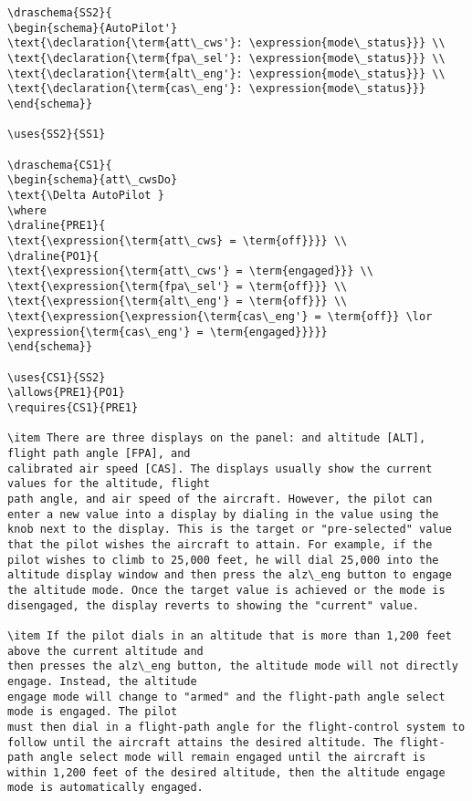 \begin{verbatim}
\draschema{SS2}{
\begin{schema}{AutoPilot'}
\text{\declaration{\term{att\_cws'}: \expression{mode\_status}}} \\
\text{\declaration{\term{fpa\_sel'}: \expression{mode\_status}}} \\
\text{\declaration{\term{alt\_eng'}: \expression{mode\_status}}} \\
\text{\declaration{\term{cas\_eng'}: \expression{mode\_status}}} 
\end{schema}}

\uses{SS2}{SS1}

\draschema{CS1}{
\begin{schema}{att\_cwsDo}
\text{\Delta AutoPilot }
\where
\draline{PRE1}{
\text{\expression{\term{att\_cws} = \term{off}}}} \\
\draline{PO1}{
\text{\expression{\term{att\_cws'} = \term{engaged}}} \\
\text{\expression{\term{fpa\_sel'} = \term{off}}} \\
\text{\expression{\term{alt\_eng'} = \term{off}}} \\
\text{\expression{\expression{\term{cas\_eng'} = \term{off}} \lor \expression{\term{cas\_eng'} = \term{engaged}}}}}
\end{schema}}

\uses{CS1}{SS2}
\allows{PRE1}{PO1}
\requires{CS1}{PRE1}

\item There are three displays on the panel: and altitude [ALT], flight path angle [FPA], and
calibrated air speed [CAS]. The displays usually show the current values for the altitude, flight
path angle, and air speed of the aircraft. However, the pilot can enter a new value into a display by dialing in the value using the knob next to the display. This is the target or "pre-selected" value that the pilot wishes the aircraft to attain. For example, if the pilot wishes to climb to 25,000 feet, he will dial 25,000 into the altitude display window and then press the alz\_eng button to engage the altitude mode. Once the target value is achieved or the mode is disengaged, the display reverts to showing the "current" value.

\item If the pilot dials in an altitude that is more than 1,200 feet above the current altitude and
then presses the alz\_eng button, the altitude mode will not directly engage. Instead, the altitude
engage mode will change to "armed" and the flight-path angle select mode is engaged. The pilot
must then dial in a flight-path angle for the flight-control system to follow until the aircraft attains the desired altitude. The flight-path angle select mode will remain engaged until the aircraft is within 1,200 feet of the desired altitude, then the altitude engage mode is automatically engaged.


\end{verbatim}
